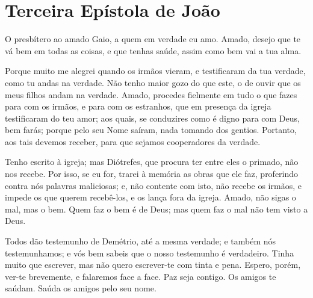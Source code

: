 \thispagestyle{empty}

\chapter*{Terceira Epístola de João}

O presbítero ao amado Gaio, a quem em verdade eu amo. Amado,
desejo que te vá bem em todas as coisas, e que tenhas saúde, assim
como bem vai a tua alma.

Porque muito me alegrei quando os irmãos vieram, e testificaram da
tua verdade, como tu andas na verdade. Não tenho maior gozo do
que este, o de ouvir que os meus filhos andam na verdade. Amado,
procedes fielmente em tudo o que fazes para com os irmãos, e para
com os estranhos, que em presença da igreja testificaram do teu
amor; aos quais, se conduzires como é digno para com Deus, bem
farás; porque pelo seu Nome saíram, nada tomando dos gentios.
Portanto, aos tais devemos receber, para que sejamos
cooperadores da verdade.

Tenho escrito à igreja; mas Diótrefes, que procura ter entre eles
o primado, não nos recebe. Por isso, se eu for, trarei à
memória as obras que ele faz, proferindo contra nós palavras
maliciosas; e, não contente com isto, não recebe os irmãos, e impede
os que querem recebê-los, e os lança fora da igreja. Amado,
não sigas o mal, mas o bem. Quem faz o bem é de Deus; mas quem faz o
mal não tem visto a Deus.

Todos dão testemunho de Demétrio, até a mesma verdade; e também
nós testemunhamos; e vós bem sabeis que o nosso testemunho é
verdadeiro. Tinha muito que escrever, mas não quero
escrever-te com tinta e pena. Espero, porém, ver-te
brevemente, e falaremos face a face. Paz seja contigo. Os
amigos te saúdam. Saúda os amigos pelo seu nome.

